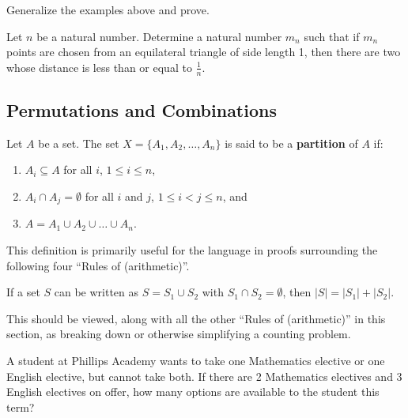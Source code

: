 \begin{exercise} Generalize the examples above and prove.
\end{exercise}

\begin{example} Let $n$ be a natural number. Determine a natural number $m_n$ such that if $m_n$ points are chosen from an equilateral triangle of side length 1, then there are two whose distance is less than or equal to $\frac{1}{n}$.
\end{example}

\subsection{Permutations and Combinations}
\begin{definition}\label{def:partition} Let $A$ be a set.  The set $X=\{A_1, A_2, \ldots, A_n\}$ is said to be a \textbf{partition} of $A$ if:
\begin{enumerate}
    \item $A_i \subseteq A$ for all $i$, $1\leq i \leq n$,
    \item $A_i \cap A_j = \emptyset$ for all $i$ and $j$, $1 \leq i < j \leq n$, and
    \item $A = A_1 \cup A_2 \cup \ldots \cup A_n$.
\end{enumerate}

This definition is primarily useful for the language in proofs surrounding the following four ``Rules of (arithmetic)''.

\end{definition}

\begin{theorem} If a set $S$ can be written as $S = S_1 \cup S_2$ with $S_1 \cap S_2 = \emptyset$, then $|S| = |S_1| + |S_2|$.
\end{theorem}

\begin{remark} This should be viewed, along with all the other ``Rules of (arithmetic)'' in this section, as breaking down or otherwise simplifying a counting problem.
\end{remark}

\begin{example} A student at Phillips Academy wants to take one Mathematics elective or one English elective, but cannot take both.  If there are 2 Mathematics electives and 3 English electives on offer, how many options are available to the student this term?
\end{example}

